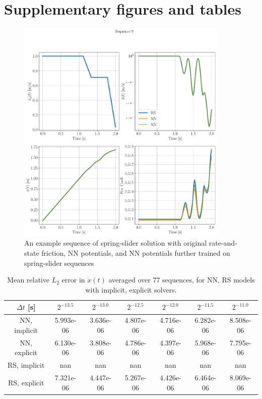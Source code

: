 \newpage
\appendix
\section{Supplementary figures and tables}
\begin{figure}[htbp]
    \centering
    \includegraphics[width=0.9\textwidth]{figures/SS_seq9_0216_0521SS_combined_800.pdf}
    \caption{An example sequence of spring-slider solution with original rate-and-state friction, 
    NN potentials, 
    and NN potentials further trained on spring-slider sequences}
    \label{fig:SSseq9}
\end{figure}

\begin{table}[htbp]
    \centering
    \begin{tabular}{ccccccc}
        \hline
        $\Delta t$ [s] & $2^{-13.5}$ & $2^{-13.0}$ & $2^{-12.5}$ & $2^{-12.0}$ & $2^{-11.5}$ & $2^{-11.0}$ \\
        \hline
        NN, implicit & 5.993e-06 & 3.636e-06 & 4.807e-06 & 4.716e-06 & 6.282e-06 & 8.508e-06 \\
        NN, explicit & 6.130e-06 & 3.808e-06 & 4.786e-06 & 4.397e-06 & 5.968e-06 & 7.795e-06 \\
        RS, implicit & nan & nan & nan & nan & nan & nan \\
        RS, explicit & 7.321e-06 & 4.447e-06 & 5.267e-06 & 4.426e-06 & 6.464e-06 & 8.069e-06 \\
        \hline
    \end{tabular}
    \caption{Mean relative $L_2$ error in $\dot{x}(t)$ averaged over 77 sequences, 
    for NN, RS models with implicit, explicit solvers.}
    \label{tab:MeanL2ErrorSpringSliderRsVsNNRespective}
\end{table}

